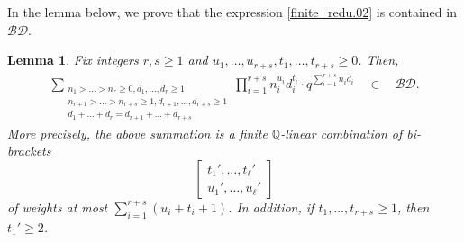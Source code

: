 \documentclass[12pt, reqno]{amsart}
\newtheorem{lemma}[theorem]{Lemma}
\theoremstyle{definition}
\theoremstyle{remark}
\numberwithin{equation}{section}
\newcommand{\BD}{\mathcal {BD}}
\newcommand{\Q}{ \mathbb Q }
\numberwithin{equation}{section}
\begin{document}
In the lemma below, we prove that the expression \eqref{finite_redu.02} 
is contained in $\BD$.

\begin{lemma}  \label{lemma_t2t1yq} 
Fix integers $r, s \ge 1$ and $u_1, \ldots, u_{r+s}, 
t_1, \ldots, t_{r+s} \ge 0$. Then,
\begin{eqnarray}  \label{lemma_t2t1yq.0}
\sum_{\substack{n_1 > \ldots > n_r \ge 0, d_1, \ldots, d_r \ge 1\\
    n_{r+1} > \ldots > n_{r+s} \ge 1, d_{r+1}, \ldots, d_{r+s} \ge 1\\
    d_1+ \ldots + d_r = d_{r+1} + \ldots + d_{r+s}}}
  \prod_{i=1}^{r+s} n_i^{u_i}d_i^{t_i} \cdot q^{\sum_{i=1}^{r+s} n_i d_i}
\quad \in \quad \BD.
\end{eqnarray}
More precisely, the above summation is a finite $\Q$-linear combination of 
bi-brackets 
$$
\begin{bmatrix} t_1', \ldots, t_\ell'\\u_1', \ldots, u_\ell' \end{bmatrix}
$$
of weights at most $\sum_{i=1}^{r+s} (u_i + t_i+1)$. In addition, 
if $t_1, \ldots, t_{r+s} \ge 1$, then $t_1' \ge 2$. 
\end{lemma}
\end{document}
